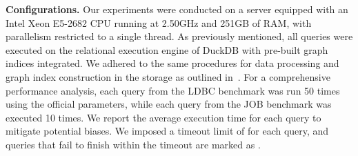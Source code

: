 
\noindent\textbf{Configurations. }
Our experiments were conducted on a server equipped with an Intel Xeon E5-2682 CPU running at 2.50GHz and 251GB of RAM, with parallelism restricted to a single thread.
As previously mentioned, all queries were executed on the relational execution engine of DuckDB with pre-built graph indices integrated.
We adhered to the same procedures for data processing and graph index construction in the storage as outlined in~\cite{graindb}.
For a comprehensive performance analysis, each query from the LDBC benchmark was run 50 times using the official parameters, while each query from the JOB benchmark was executed 10 times. We report the average execution time for each query to mitigate potential biases.
We imposed a timeout limit of  for each query, and queries that fail to finish within the timeout are marked as \ot.

